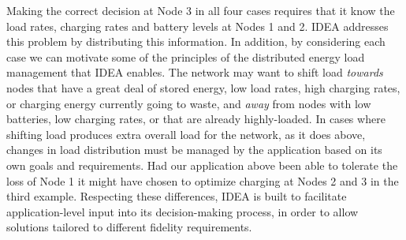 Making the correct decision at Node 3 in all four cases requires that it know
the load rates, charging rates and battery levels at Nodes 1 and 2. IDEA
addresses this problem by distributing this information. In addition, by
considering each case we can motivate some of the principles of the
distributed energy load management that IDEA enables. The network may want to
shift load \textit{towards} nodes that have a great deal of stored energy,
low load rates, high charging rates, or charging energy currently
going to waste, and \textit{away} from nodes with low batteries, low
charging rates, or that are already highly-loaded. In cases where shifting
load produces extra overall load for the network, as it does above, changes
in load distribution must be managed by the application based on
its own goals and requirements. Had our application above been able to
tolerate the loss of Node 1 it might have chosen to optimize charging at
Nodes 2 and 3 in the third example. Respecting these differences, IDEA
is built to facilitate application-level input into its decision-making
process, in order to allow solutions tailored to different fidelity
requirements.

